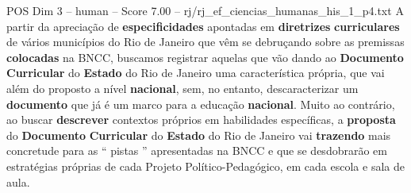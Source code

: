 \begin{textsample}{POS Dim 3 – human – Score 7.00 – rj/rj\_ef\_ciencias\_humanas\_his\_1\_p4.txt}  \label{ex:f3_pos_003}
A partir da apreciação de \textbf{especificidades} apontadas em \textbf{diretrizes} \textbf{curriculares} de vários municípios do Rio de Janeiro que vêm se debruçando sobre as premissas \textbf{colocadas} na BNCC, buscamos registrar aquelas que vão dando ao \textbf{Documento} \textbf{Curricular} do \textbf{Estado} do Rio de Janeiro uma característica própria, que vai além do proposto a nível \textbf{nacional}, sem, no entanto, descaracterizar um \textbf{documento} que já é um marco para a educação \textbf{nacional}.
Muito ao contrário, ao buscar \textbf{descrever} contextos próprios em habilidades específicas, a \textbf{proposta} do \textbf{Documento} \textbf{Curricular} do \textbf{Estado} do Rio de Janeiro vai \textbf{trazendo} mais concretude para as “ pistas ” apresentadas na BNCC e que se desdobrarão em estratégias próprias de cada Projeto Político-Pedagógico, em cada escola e sala de aula.

\end{textsample}
